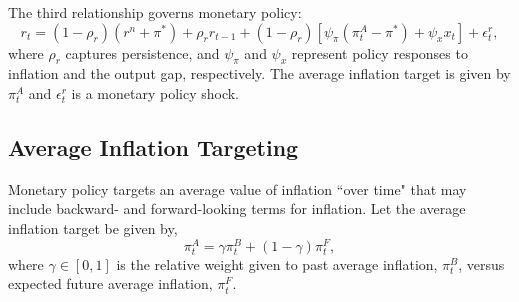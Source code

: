 \documentclass[english,authoryear,12pt]{elsarticle}
\begin{document}
The third relationship governs monetary policy:
\begin{equation}\label{eq:TaylorRule}
	r_t = (1-\rho_r)(r^n + \pi^*) + \rho_r r_{t-1} + (1-\rho_r) \left[ \psi_\pi (\pi_t^A - \pi^*) + \psi_x x_t \right] + \epsilon_t^{r},
\end{equation}
where $\rho_r$ captures persistence, and $\psi_\pi$ and $\psi_x$ represent policy responses to inflation and the output gap, respectively. The average inflation target is given by $\pi_t^A$ and $\epsilon_t^r$ is a monetary policy shock.

\subsection{Average Inflation Targeting}

Monetary policy targets an average value of inflation ``over time" that may include backward- and forward-looking terms for inflation. Let the average inflation target be given by,
\begin{equation}
	\pi_t^A = \gamma \pi_t^B + (1-\gamma) \pi_t^F,
\end{equation}
where $\gamma \in [0,1]$ is the relative weight given to past average inflation, $\pi_t^B$, versus expected future average inflation, $\pi_t^F$. 
\end{document}
